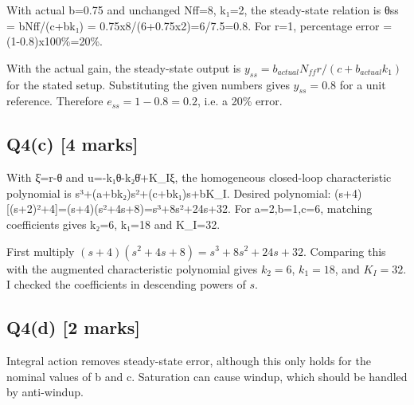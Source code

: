 \documentclass[11pt,a4paper]{article}
\begin{document}
With actual b=0.75 and unchanged Nff=8, k₁=2, the steady-state relation is θss = bNff/(c+bk₁) = 0.75x8/(6+0.75x2)=6/7.5=0.8.
For r=1, percentage error = (1-0.8)x100\%=20\%.\par\smallskip With the actual gain, the steady-state output is $y_{ss}=b_{actual}N_{ff}r/ (c+b_{actual}k_1)$ for the stated setup. Substituting the given numbers gives $y_{ss}=0.8$ for a unit reference. Therefore $e_{ss}=1-0.8=0.2$, i.e. a 20\% error.

\subsection*{Q4(c) \hfill [4 marks]}

With ξ̇=r-θ and u=-k₁θ-k₂θ̇+K\_Iξ, the homogeneous closed-loop characteristic polynomial is s³+(a+bk₂)s²+(c+bk₁)s+bK\_I.
Desired polynomial: (s+4)[(s+2)²+4]=(s+4)(s²+4s+8)=s³+8s²+24s+32.
For a=2,b=1,c=6, matching coefficients gives k₂=6, k₁=18 and K\_I=32.\par\smallskip First multiply $(s+4)(s^2+4s+8)=s^3+8s^2+24s+32$. Comparing this with the augmented characteristic polynomial gives $k_2=6$, $k_1=18$, and $K_I=32$. I checked the coefficients in descending powers of $s$.

\subsection*{Q4(d) \hfill [2 marks]}

Integral action removes steady-state error, although this only holds for the nominal values of b and c.
Saturation can cause windup, which should be handled by anti-windup.
\end{document}
